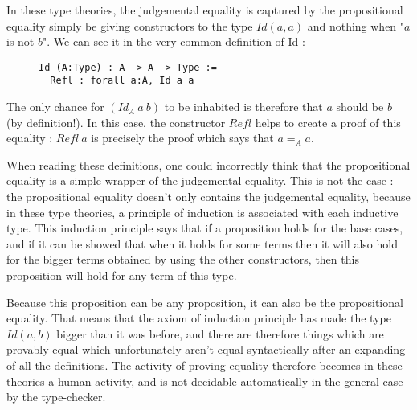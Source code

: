 \documentclass{jfp1}
\begin{document}
In these type theories, the judgemental equality is captured by the propositional equality simply be giving constructors to the type $Id(a,a)$ and nothing when "$a$ is not $b$".
We can see it in the very common definition of Id :
\begin{figure}[H]
\figrule
\begin{center}
\begin{verbatim}
Id (A:Type) : A -> A -> Type :=
  Refl : forall a:A, Id a a
\end{verbatim}
\end{center}
\figrule
\end{figure}

The only chance for $(Id_A\ a\ b)$ to be inhabited is therefore that $a$ should be $b$ (by definition!). In this case, the constructor $Refl$ helps to create a proof of this equality : $Refl\ a$ is precisely the proof which says that $a=_Aa$. 

When reading these definitions, one could incorrectly think that the propositional equality is a simple wrapper of the judgemental equality. This is not the case : the propositional equality doesn't only contains the judgemental equality, because in these type theories, a principle of induction is associated with each inductive type. This induction principle says that if a proposition holds for the base cases, and if it can be showed that when it holds for some terms then it will also hold for the bigger terms obtained by using the other constructors, then this proposition will hold for any term of this type.

Because this proposition can be any proposition, it can also be the propositional equality. That means that the axiom of induction principle has made the type $Id(a,b)$ bigger than it was before, and there are therefore things which are provably equal which unfortunately aren't equal syntactically after an expanding of all the definitions. The activity of proving equality therefore becomes in these theories a human activity, and is not decidable automatically in the general case by the type-checker.
\end{document}
